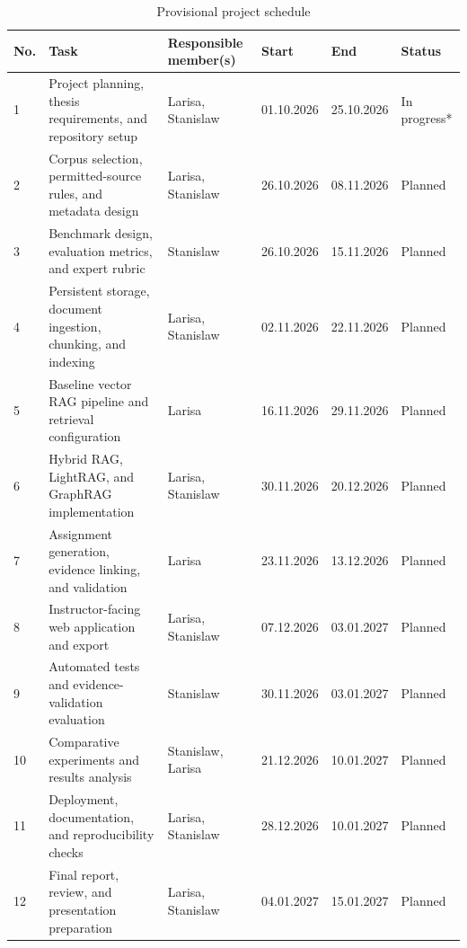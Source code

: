 \documentclass[12pt,a4paper]{article}
\begin{document}
\begin{table}[htbp]
\centering
\small
\renewcommand{\arraystretch}{1.25}
\begin{tabularx}{\textwidth}{
    |p{8mm}|X|p{32mm}|p{21mm}|p{21mm}|p{18mm}|
}
\hline
\textbf{No.} &
\textbf{Task} &
\textbf{Responsible member(s)} &
\textbf{Start} &
\textbf{End} &
\textbf{Status} \\
\hline

1 &
Project planning, thesis requirements, and repository setup &
Larisa, Stanislaw &
01.10.2026 &
25.10.2026 &
In progress* \\
\hline

2 &
Corpus selection, permitted-source rules, and metadata design &
Larisa, Stanislaw &
26.10.2026 &
08.11.2026 &
Planned \\
\hline

3 &
Benchmark design, evaluation metrics, and expert rubric &
Stanislaw &
26.10.2026 &
15.11.2026 &
Planned \\
\hline

4 &
Persistent storage, document ingestion, chunking, and indexing &
Larisa, Stanislaw &
02.11.2026 &
22.11.2026 &
Planned \\
\hline

5 &
Baseline vector RAG pipeline and retrieval configuration &
Larisa &
16.11.2026 &
29.11.2026 &
Planned \\
\hline

6 &
Hybrid RAG, LightRAG, and GraphRAG implementation &
Larisa, Stanislaw &
30.11.2026 &
20.12.2026 &
Planned \\
\hline

7 &
Assignment generation, evidence linking, and validation &
Larisa &
23.11.2026 &
13.12.2026 &
Planned \\
\hline

8 &
Instructor-facing web application and export &
Larisa, Stanislaw &
07.12.2026 &
03.01.2027 &
Planned \\
\hline

9 &
Automated tests and evidence-validation evaluation &
Stanislaw &
30.11.2026 &
03.01.2027 &
Planned \\
\hline

10 &
Comparative experiments and results analysis &
Stanislaw, Larisa &
21.12.2026 &
10.01.2027 &
Planned \\
\hline

11 &
Deployment, documentation, and reproducibility checks &
Larisa, Stanislaw &
28.12.2026 &
10.01.2027 &
Planned \\
\hline

12 &
Final report, review, and presentation preparation &
Larisa, Stanislaw &
04.01.2027 &
15.01.2027 &
Planned \\
\hline
\end{tabularx}
\caption{Provisional project schedule}
\label{tab:project-schedule}
\end{table}
\end{document}
